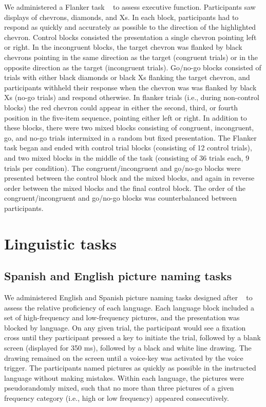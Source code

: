 We administered a Flanker task ~\citep[e.g.,][]{Emmorey2008a} to assess executive function. Participants saw displays of chevrons, diamonds, and Xs. In each block, participants had to respond as quickly and accurately as possible to the direction of the highlighted chevron. Control blocks consisted the presentation a single chevron pointing left or right. In the incongruent blocks, the target chevron was flanked by black chevrons pointing in the same direction as the target (congruent trials) or in the opposite direction as the target (incongruent trials). Go\slash no-go blocks consisted of trials with either black diamonds or black Xs flanking the target chevron, and participants withheld their response when the chevron was was flanked by black Xs (no-go trials) and respond otherwise. In flanker trials (i.e., during non-control blocks) the red chevron could appear in either the second, third, or fourth position in the five-item sequence, pointing either left or right. In addition to these blocks, there were two mixed blocks consisting of congruent, incongruent, go, and no-go trials intermixed in a random but fixed presentation. The Flanker task began and ended with control trial blocks (consisting of 12 control trials), and two mixed blocks in the middle of the task (consisting of 36 trials each, 9 trials per condition). The congruent\slash incongruent and go\slash no-go blocks were presented between the control block and the mixed blocks, and again in reverse order between the mixed blocks and the final control block. The order of the congruent\slash incongruent and go\slash no-go blocks was counterbalanced between participants.

\section{Linguistic tasks}
\label{linguistictasks}

\subsection{Spanish and English picture naming tasks}
\label{spanishandenglishpicturenamingtasks}

We administered English and Spanish picture naming tasks designed after ~\citep{Gollan2008} to assess the relative proficiency of each language. Each language block included a set of high-frequency and low-frequency pictures, and the presentation was blocked by language. On any given trial, the participant would see a fixation cross until they participant pressed a key to initiate the trial, followed by a blank screen (displayed for 350 ms), followed by a black and white line drawing. The drawing remained on the screen until a voice-key was activated by the voice trigger. The participants named pictures as quickly as possible in the instructed language without making mistakes. Within each language, the pictures were pseudorandomly mixed, such that no more than three pictures of a given frequency category (i.e., high or low frequency) appeared consecutively.

